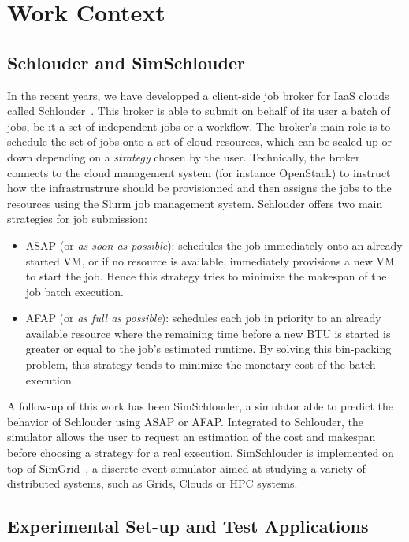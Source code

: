 \documentclass[10pt,conference,compsocconf]{IEEEtran}
\begin{document}
\section{Work Context}

\subsection{Schlouder and SimSchlouder}
In the recent years, we have developped a client-side job broker for IaaS clouds
called Schlouder~\cite{Michon17}. This broker is able to submit on behalf of its
user a  batch of  jobs, be  it a  set of  independent jobs  or a  workflow.  The
broker's main role is to schedule the set of jobs onto a set of cloud resources,
which can  be scaled  up or down  depending on a  \emph{strategy} chosen  by the
user.   Technically, the  broker connects  to the  cloud management  system (for
instance OpenStack) to  instruct how the infrastrustrure  should be provisionned
and  then assigns  the jobs  to  the resources  using the  Slurm job  management
system.  Schlouder offers two main strategies for job submission:
\begin{itemize}
\item ASAP (or \textit{as soon as possible}): schedules the job immediately onto
  an already started VM, or if  no resource is available, immediately provisions
  a new VM to start the job.  Hence this strategy tries to minimize the makespan
  of the job batch execution.

\item AFAP (or \textit{as full as  possible}): schedules each job in priority to
  an already  available resource where  the remaining time  before a new  BTU is
  started is greater or equal to the job's estimated runtime. By solving this 
 bin-packing problem, this strategy tends to minimize the monetary cost of the
 batch execution.
\end{itemize}

A follow-up of this work has been  SimSchlouder, a simulator able to predict the
behavior of Schlouder using ASAP or AFAP. Integrated to Schlouder, the simulator
allows  the user  to  request an  estimation  of the  cost  and makespan  before
choosing a strategy for a real execution.  SimSchlouder is implemented on top of
SimGrid~\cite{simgrid}, a discrete  event simulator aimed at  studying a variety
of distributed systems, such as Grids, Clouds or HPC systems.

\subsection{Experimental Set-up and Test Applications}
\end{document}
